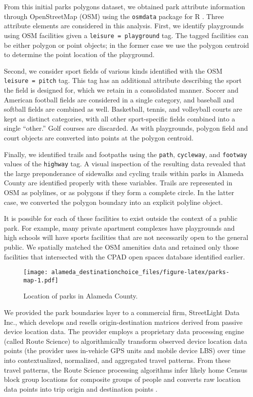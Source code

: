 \documentclass[3p, authoryear, review]{elsarticle} %
\makeatletter
\def\maxwidth{\ifdim\Gin@nat@width>\linewidth\linewidth
\else\Gin@nat@width\fi}
\let\Oldincludegraphics\includegraphics
\renewcommand{\includegraphics}[1]{\Oldincludegraphics[width=\maxwidth]{#1}}
\makeatother
\begin{document}
From this initial parks polygons dataset, we obtained park attribute information
through OpenStreetMap (OSM) using the \texttt{osmdata} package for R \citep{osmdata}. Three
attribute elements are considered in this analysis. First, we identify
playgrounds using OSM facilities given a \texttt{leisure\ =\ playground} tag. The tagged
facilities can be either polygon or point objects; in the former case we use the
polygon centroid to determine the point location of the playground.

Second, we consider sport fields of various kinds identified with the OSM
\texttt{leisure\ =\ pitch} tag. This tag has an additional attribute describing the sport
the field is designed for, which we retain in a consolidated manner. Soccer and
American football fields are considered in a single category, and baseball and
softball fields are combined as well. Basketball, tennis, and volleyball courts
are kept as distinct categories, with all other sport-specific fields combined
into a single ``other.'' Golf courses are discarded. As with playgrounds, polygon
field and court objects are converted into points at the polygon centroid.

Finally, we identified trails and footpaths using the \texttt{path}, \texttt{cycleway}, and
\texttt{footway} values of the \texttt{highway} tag. A visual inspection of the resulting data
revealed that the large preponderance of sidewalks and cycling trails within
parks in Alameda County are identified properly with these variables. Trails are
represented in OSM as polylines, or as polygons if they form a complete circle.
In the latter case, we converted the polygon boundary into an explicit polyline
object.

It is possible for each of these facilities to exist outside the context of a
public park. For example, many private apartment complexes have playgrounds and
high schools will have sports facilities that are not necessarily open to the
general public. We spatially matched the OSM amenities data and retained only
those facilities that intersected with the CPAD open spaces database identified
earlier.

\begin{figure}
\centering
\texttt{[image: alameda\_destinationchoice\_files/figure-latex/parks-map-1.pdf]}
\caption{\label{fig:parks-map}Location of parks in Alameda County.}
\end{figure}

We provided the park boundaries layer to a commercial firm, StreetLight Data
Inc., which develops and resells origin-destination matrices derived from
passive device location data. The provider employs a proprietary data processing
engine (called Route Science) to algorithmically transform observed device
location data points (the provider uses in-vehicle GPS units and mobile device
LBS) over time into contextualized, normalized, and aggregated travel patterns.
From these travel patterns, the Route Science processing algorithms infer likely
home Census block group locations for composite groups of people and converts
raw location data points into trip origin and destination points \citep{Pan2006, Friedrich2010}.
\end{document}

